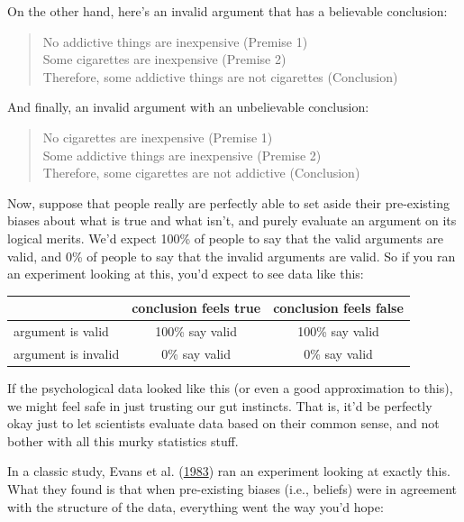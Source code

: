 \documentclass[
  11pt,
  a4paper,
  twoside,symmetric,openright]{book}
\theoremstyle{break}
\theoremstyle{break}
\begin{document}
On the other hand, here's an invalid argument that has a believable conclusion:

\begin{quote}
No addictive things are inexpensive (Premise 1)\\
Some cigarettes are inexpensive (Premise 2)\\
Therefore, some addictive things are not cigarettes (Conclusion)
\end{quote}

And finally, an invalid argument with an unbelievable conclusion:

\begin{quote}
No cigarettes are inexpensive (Premise 1)\\
Some addictive things are inexpensive (Premise 2)\\
Therefore, some cigarettes are not addictive (Conclusion)
\end{quote}

Now, suppose that people really are perfectly able to set aside their pre-existing biases about what is true and what isn't, and purely evaluate an argument on its logical merits. We'd expect 100\% of people to say that the valid arguments are valid, and 0\% of people to say that the invalid arguments are valid. So if you ran an experiment looking at this, you'd expect to see data like this:

\begin{table}[H]
\centering
\begin{tabular}{lcc}
\toprule
  & conclusion feels true & conclusion feels false\\
\midrule
argument is valid & 100\% say valid & 100\% say valid\\
argument is invalid & 0\% say valid & 0\% say valid\\
\bottomrule
\end{tabular}
\end{table}

If the psychological data looked like this (or even a good approximation to this), we might feel safe in just trusting our gut instincts. That is, it'd be perfectly okay just to let scientists evaluate data based on their common sense, and not bother with all this murky statistics stuff.

In a classic study, Evans et al. (\protect\hyperlink{ref-Evans1983}{1983}) ran an experiment looking at exactly this. What they found is that when pre-existing biases (i.e., beliefs) were in agreement with the structure of the data, everything went the way you'd hope:
\end{document}
